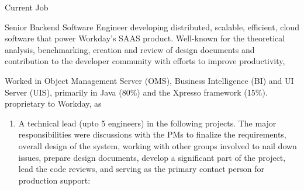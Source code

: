 \documentclass{resume}
\begin{document}
\begin{category}{Current Job}

Senior Backend Software Engineer developing distributed, scalable, efficient, cloud software that power Workday's SAAS product.   Well-known for the
theoretical analysis, benchmarking, creation and review of design documents and contribution to the developer community with efforts to improve productivity,

Worked in Object Management Server (OMS), Business Intelligence (BI) and UI Server (UIS), primarily in Java (80\%) and the Xpresso framework (15\%).
proprietary to Workday, as





  


\begin{enumerate}
\item A technical lead (upto 5 engineers) in the following projects.  The major responsibilities were discussions with the PMs to finalize the
  requirements, overall design of the system, working with other groups involved to nail down issues, prepare design documents, develop a significant
  part of the project, lead the code reviews, and serving as the primary contact person for production support:


\end{enumerate}
\end{category}
\end{document}
